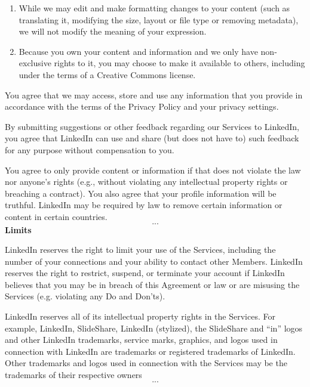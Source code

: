 \documentclass[showtrims,oldfontcommands]{kthesis}
\begin{document}
\begin{appendices}
\begin{quote_tos}
\begin{enumerate}[label=\alph*]
            \item While we may edit and make formatting changes to your content 
            (such as translating it, modifying the size, layout or file type or 
            removing metadata), we will not modify the meaning of your expression.
            \item Because you own your content and information and we only have 
            non-exclusive rights to it, you may choose to make it available to others, 
            including under the terms of a Creative Commons license.
        \end{enumerate}
        You agree that we may access, store and use any information that you provide 
        in accordance with the terms of the Privacy Policy and your privacy settings.

        By submitting suggestions or other feedback regarding our Services to LinkedIn, 
        you agree that LinkedIn can use and share (but does not have to) such feedback 
        for any purpose without compensation to you.

        You agree to only provide content or information if that does not violate 
        the law nor anyone's rights (e.g., without violating any intellectual property 
        rights or breaching a contract). You also agree that your profile information 
        will be truthful. LinkedIn may be required by law to remove certain information 
        or content in certain countries.
        \[...\]
        \textbf{Limits}
        
        LinkedIn reserves the right to limit your use of the Services, including 
        the number of your connections and your ability to contact other Members. 
        LinkedIn reserves the right to restrict, suspend, or terminate your account 
        if LinkedIn believes that you may be in breach of this Agreement or law 
        or are misusing the Services (e.g. violating any Do and Don'ts).

        LinkedIn reserves all of its intellectual property rights in the Services. 
        For example, LinkedIn, SlideShare, LinkedIn (stylized), the SlideShare and 
        “in” logos and other LinkedIn trademarks, service marks, graphics, and logos 
        used in connection with LinkedIn are trademarks or registered trademarks 
        of LinkedIn. Other trademarks and logos used in connection with the Services 
        may be the trademarks of their respective owners
        \[...\]
    \end{quote_tos}


\end{appendices}
\end{document}
